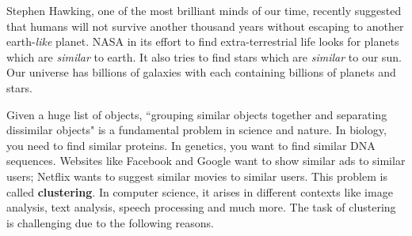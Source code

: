 \documentclass[12pt]{article}
\begin{document}
\linespread{0.901}

Stephen Hawking, one of the most brilliant minds of our time, recently suggested that humans will not survive another thousand years without escaping to another earth-\textit{like} planet. NASA in its effort to find extra-terrestrial life looks for planets which are \emph{similar} to earth. It also tries to find stars which are \emph{similar} to our sun. Our universe has billions of galaxies with each containing billions of planets and stars. 

Given a huge list of objects, ``grouping similar objects together and separating dissimilar objects" is a fundamental problem in science and nature. In biology, you need to find similar proteins. In genetics, you want to find similar DNA sequences. Websites like Facebook and Google want to show similar ads to similar users; Netflix wants to suggest similar movies to similar users. This problem is called \textbf{clustering}. In computer science, it arises in different contexts like image analysis, text analysis, speech processing and much more. The task of clustering is challenging due to the following reasons. 
\end{document}
